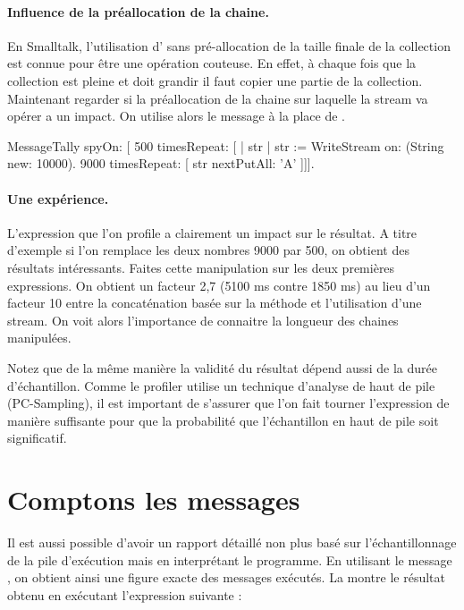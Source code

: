 \documentclass[a4paper,10pt,twoside]{book}
\begin{document}
\paragraph{Influence de la pr\'eallocation de la chaine.}
En Smalltalk, l'utilisation d' sans
pr\'e-allocation de la taille finale de la collection est connue pour
\^etre une op\'eration couteuse. En effet, \`a chaque fois que la
collection est pleine et doit grandir il faut copier une partie de la
collection. Maintenant regarder si la pr\'eallocation de la chaine
sur laquelle la stream va op\'erer a un impact. On utilise alors le
message  \`a la place de .


\begin{code}{}
MessageTally spyOn: 
    [ 500 timesRepeat: [
                    | str |  
                    str := WriteStream on: (String new: 10000). 
                    9000 timesRepeat: [ str nextPutAll: 'A' ]]].
\end{code}

\paragraph{Une exp\'erience.}
L'expression que l'on profile a clairement un impact sur le
r\'esultat. A titre d'exemple si l'on remplace les deux nombres 9000 par 500,
 on obtient des r\'esultats int\'eressants. Faites cette
manipulation sur les deux premi\`eres expressions. 
On obtient un facteur 2,7 (5100 ms contre 1850 ms) au lieu d'un facteur 10
entre la concat\'enation bas\'ee sur la m\'ethode \ct{,} et
l'utilisation d'une stream. On voit alors l'importance de
connaitre la longueur des chaines manipul\'ees. 

Notez que de la m\^eme mani\`ere la validit\'e du r\'esultat d\'epend
aussi de la dur\'ee d'\'echantillon. Comme le profiler utilise un
technique d'analyse de haut de pile (PC-Sampling), il est important de
s'assurer que l'on fait tourner l'expression de mani\`ere suffisante
pour que la probabilit\'e que l'\'echantillon en haut de pile soit significatif.





\section{Comptons les messages}
Il est aussi possible d'avoir un rapport d\'etaill\'e non plus bas\'e
sur l'\'echantillonnage de la pile d'ex\'ecution mais en
interpr\'etant le programme. En utilisant le message ,
on obtient ainsi une figure exacte des messages ex\'ecut\'es. La
 montre le r\'esultat obtenu en ex\'ecutant
l'expression suivante :
\end{document}
